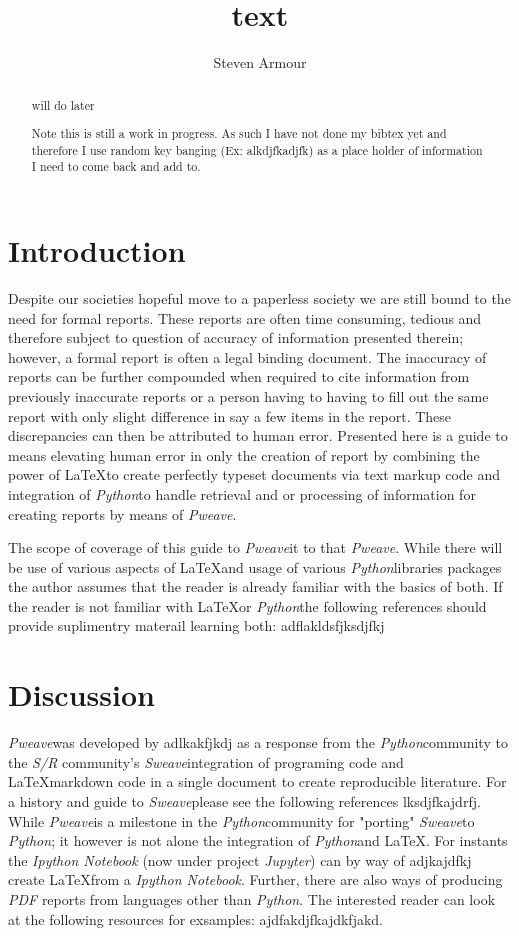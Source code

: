 \documentclass[a4paper,11pt,final]{article}
\newcommand{\pweave}{\emph{Pweave}\space}
\newcommand{\python}{\emph{Python}\space}
\newcommand{\latex}{\LaTeX\space}
\newcommand{\sweave}{\emph{Sweave}\space}
\begin{document}
\title{text}
\author{Steven Armour}

\maketitle


\begin{abstract}
will do later

Note this is still a work in progress. As such I have not done my bibtex yet and therefore I use random key banging (Ex: alkdjfkadjfk) as a place holder of information I need to come back and add to.
\end{abstract}

\section{Introduction}
  Despite our societies hopeful move to a paperless society we are still bound to the need for formal reports. These reports are often time consuming, tedious and therefore subject to question of accuracy of information presented therein; however, a formal report is often a legal binding document. The inaccuracy of reports can be further compounded when required to cite information from previously inaccurate reports or a person having to having to fill out the same report with only slight difference in say a few items in the report. These discrepancies can then be attributed to human error. Presented here is a guide to means elevating human error in only the creation of report by combining the power of \latex to create perfectly typeset documents via text markup code and integration of \python to handle retrieval and or processing of information for creating reports by means of \pweave.

  The scope of coverage of this guide to \pweave it to that \pweave. While there will be use of various aspects of \latex and usage of various \python libraries packages the author assumes that the reader is already familiar with the basics of both. If the reader is not familiar with \latex or \python the following references should provide suplimentry materail learning both: adflakldsfjksdjfkj

\section{Discussion}
  \pweave was developed by adlkakfjkdj as a response from the \python community to the \emph{S/R} community's \sweave integration of programing code and \latex markdown code in a single document to create reproducible literature. For a history and guide to \sweave please see the following references lksdjfkajdrfj. While \pweave is a milestone in the \python community for "porting" \sweave to \python; it however is not alone the integration of \python and \latex. For instants the \emph{Ipython Notebook} (now under project \emph{Jupyter}) can by way of adjkajdfkj create \latex from a \emph{Ipython Notebook}. Further, there are also ways of producing \emph{PDF} reports from languages other than \python. The interested reader can look at the following resources for exsamples: ajdfakdjfkajdkfjakd.
\end{document}
